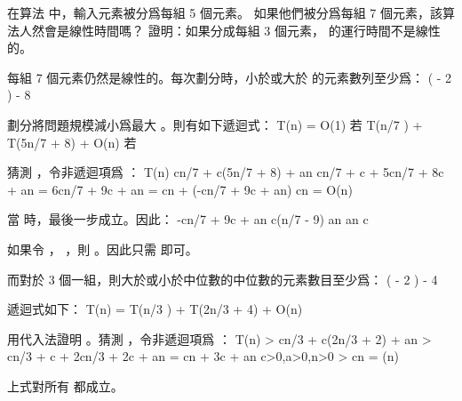 \startsection[
  title={Selection in worst-case linear time},
  reference=section:worstcase_linear_selection,
]

\startEXERCISE
在算法  中，輸入元素被分爲每組 5 個元素。
如果他們被分爲每組 7 個元素，該算法人然會是線性時間嗎？
證明：如果分成每組 3 個元素，  的運行時間不是線性的。
\stopEXERCISE

\startANSWER
每組 7 個元素仍然是線性的。每次劃分時，小於或大於  的元素數列至少爲：
 \left(\left\lceil {} \left\lceil {} \right\rceil \right\rceil
           - 2 \right) \ge {} - 8
\stopformula

劃分將問題規模減小爲最大 。則有如下遞迴式：
\startformula
T(n) = \startmathcases
 \NC O(1) \NC 若  \NR
 \NC T(\left\lceil n/7 \right\rceil) + T(5n/7 + 8) + O(n) \NC 若  \NR
\stopmathcases
\stopformula

猜測 ，令非遞迴項爲 ：
\startformula\startmathalignment
\NC T(n) \NC \le c\left\lceil n/7 \right\rceil + c(5n/7 + 8) + an \NR
\NC \NC \le cn/7 + c + 5cn/7 + 8c + an \NR
\NC \NC = 6cn/7 + 9c + an \NR
\NC \NC = cn + (-cn/7 + 9c + an) \NR
\NC \NC \le cn \NR
\NC \NC = O(n) \NR
\stopmathalignment\stopformula

當  時，最後一步成立。因此：
\startformula\startmathalignment[n=1]
\NC -cn/7 + 9c + an  \NR
\NC \Downarrow \NR
\NC c(n/7 - 9) \ge an \NR
\NC \Downarrow \NR
\NC {} \ge an \NR
\NC \Downarrow \NR
\NC c \ge {} \NR
\stopmathalignment\stopformula

如果令 ， ，則 。因此只需  即可。

而對於 3 個一組，則大於或小於中位數的中位數的元素數目至少爲：
 \left(\left\lceil {} \left\lceil {} \right\rceil \right\rceil
           - 2 \right) \ge {} - 4
\stopformula

遞迴式如下：
\startformula
T(n) = T(\left\lceil n/3 \right\rceil) + T(2n/3 + 4) + O(n)
\stopformula

用代入法證明 。猜測 ，令非遞迴項爲 ：
\startformula\startmathalignment
\NC T(n) \NC > c\left\lceil n/3 \right\rceil + c(2n/3 + 2) + an \NR
\NC \NC > cn/3 + c + 2cn/3 + 2c + an \NR
\NC \NC = cn + 3c + an \qquad c>0,a>0,n>0\NR
\NC \NC > cn \NR
\NC \NC = \omega(n) \NR
\stopmathalignment\stopformula

上式對所有  都成立。
\stopANSWER

